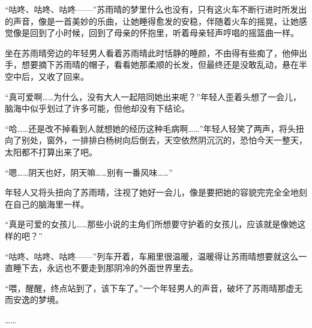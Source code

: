 “咕咚、咕咚、咕咚——”苏雨晴的梦里什么也没有，只有这火车不断行进时所发出的声音，像是一首美妙的乐曲，让她睡得愈发的安稳，伴随着火车的摇晃，让她感觉像是回到了小时候，回到了母亲的怀抱里，听着母亲轻声哼唱的摇篮曲一样。

坐在苏雨晴旁边的年轻男人看着苏雨晴此时恬静的睡颜，不由得有些痴了，他伸出手，想要摘下苏雨晴的帽子，看看她那柔顺的长发，但最终还是没敢乱动，悬在半空中后，又收了回来。

“真可爱啊……为什么，没有大人一起陪同她出来呢？”年轻人歪着头想了一会儿，脑海中似乎划过了许多可能，但他却没有下结论。

“哈……还是改不掉看到人就想她的经历这种毛病啊……”年轻人轻笑了两声，将头扭向了别处，窗外，一排排白杨树向后倒去，天空依然阴沉沉的，恐怕今天一整天，太阳都不打算出来了吧。

“嗯……阴天也好，阴天嘛……别有一番风味……”

年轻人又将头扭向了苏雨晴，注视了她好一会儿，像是要把她的容貌完完全全地刻在自己的脑海里一样。

“真是可爱的女孩儿……那些小说的主角们所想要守护着的女孩儿，应该就是像她这样的吧？”

“咕咚、咕咚、咕咚——”列车开着，车厢里很温暖，温暖得让苏雨晴想要就这么一直睡下去，永远也不要走到那阴冷的外面世界里去。

“喂，醒醒，终点站到了，该下车了。”一个年轻男人的声音，破坏了苏雨晴那虚无而安逸的梦境。

……
